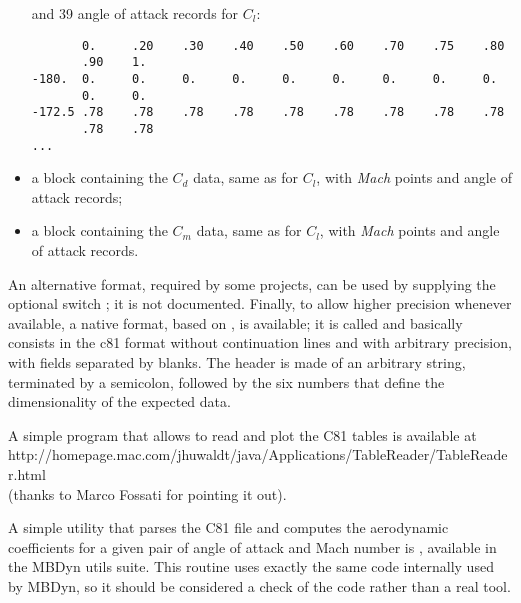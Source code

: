 \begin{itemize}
and 39 angle of attack records for $C_l$:
{\small
\begin{verbatim}
       0.     .20    .30    .40    .50    .60    .70    .75    .80
       .90    1.
-180.  0.     0.     0.     0.     0.     0.     0.     0.     0.
       0.     0.
-172.5 .78    .78    .78    .78    .78    .78    .78    .78    .78
       .78    .78
...
\end{verbatim}
}
\item a block containing the $C_d$ data, same as for $C_l$,
with  \emph{Mach} points and  angle of attack records;
\item a block containing the $C_m$ data, same as for $C_l$,
with  \emph{Mach} points and  angle of attack records.
\end{itemize}
An alternative format, required by some projects, can be used by supplying
the optional switch ; it is not documented.
Finally, to allow higher precision whenever available, a native format,
based on , is available; it is called  and 
basically consists in the c81 format without continuation lines
and with arbitrary precision, with fields separated by blanks.
The header is made of an arbitrary string, terminated by a semicolon,
followed by the six numbers that define the dimensionality of the expected data.

A simple program that allows to read and plot the C81 tables
is available at \\
        {http://homepage.mac.com/jhuwaldt/java/Applications/TableReader/TableReader.html} \\
(thanks to Marco Fossati for pointing it out).

A simple utility that parses the C81 file and computes 
the aerodynamic coefficients for a given pair of angle of attack 
and Mach number is , available in the MBDyn utils suite.
This routine uses exactly the same code internally used by MBDyn,
so it should be considered a check of the code rather than a real tool.



